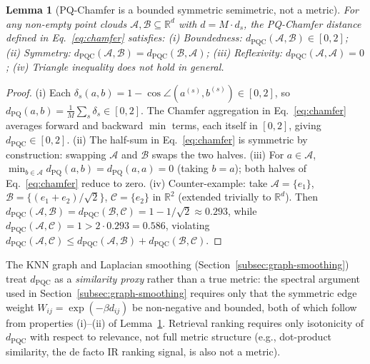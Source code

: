 \documentclass[review,1p]{elsarticle}
\newtheorem{lemma}{Lemma}
\begin{document}
\begin{lemma}[PQ-Chamfer is a bounded symmetric semimetric, not a metric]
\label{lem:pq-chamfer-semimetric}
For any non-empty point clouds $\mathcal{A}, \mathcal{B} \subseteq \mathbb{R}^{d}$ with $d = M \cdot d_s$, the PQ-Chamfer distance defined in Eq.~\eqref{eq:chamfer} satisfies:
\textup{(i) Boundedness:} $d_{\mathrm{PQC}}(\mathcal{A}, \mathcal{B}) \in [0, 2]$;
\textup{(ii) Symmetry:} $d_{\mathrm{PQC}}(\mathcal{A}, \mathcal{B}) = d_{\mathrm{PQC}}(\mathcal{B}, \mathcal{A})$;
\textup{(iii) Reflexivity:} $d_{\mathrm{PQC}}(\mathcal{A}, \mathcal{A}) = 0$;
\textup{(iv) Triangle inequality does \emph{not} hold in general.}
\end{lemma}
\begin{proof}
(i) Each $\delta_s(a,b) = 1 - \cos\angle(a^{(s)}, b^{(s)}) \in [0, 2]$, so $d_{\mathrm{PQ}}(a,b) = \tfrac{1}{M}\sum_s \delta_s \in [0, 2]$. The Chamfer aggregation in Eq.~\eqref{eq:chamfer} averages forward and backward $\min$ terms, each itself in $[0, 2]$, giving $d_{\mathrm{PQC}} \in [0, 2]$.
(ii) The half-sum in Eq.~\eqref{eq:chamfer} is symmetric by construction: swapping $\mathcal{A}$ and $\mathcal{B}$ swaps the two halves.
(iii) For $a \in \mathcal{A}$, $\min_{b \in \mathcal{A}} d_{\mathrm{PQ}}(a, b) = d_{\mathrm{PQ}}(a, a) = 0$ (taking $b = a$); both halves of Eq.~\eqref{eq:chamfer} reduce to zero.
(iv) Counter-example: take $\mathcal{A} = \{e_1\}$, $\mathcal{B} = \{(e_1 + e_2)/\sqrt{2}\}$, $\mathcal{C} = \{e_2\}$ in $\mathbb{R}^2$ (extended trivially to $\mathbb{R}^{d}$). Then $d_{\mathrm{PQC}}(\mathcal{A},\mathcal{B}) = d_{\mathrm{PQC}}(\mathcal{B},\mathcal{C}) = 1 - 1/\sqrt{2} \approx 0.293$, while $d_{\mathrm{PQC}}(\mathcal{A},\mathcal{C}) = 1 > 2 \cdot 0.293 = 0.586$, violating $d_{\mathrm{PQC}}(\mathcal{A},\mathcal{C}) \le d_{\mathrm{PQC}}(\mathcal{A},\mathcal{B}) + d_{\mathrm{PQC}}(\mathcal{B},\mathcal{C})$.
\end{proof}

\noindent The KNN graph and Laplacian smoothing (Section~\ref{subsec:graph-smoothing}) treat $d_{\mathrm{PQC}}$ as a \emph{similarity proxy} rather than a true metric: the spectral argument used in Section~\ref{subsec:graph-smoothing} requires only that the symmetric edge weight $W_{ij} = \exp(-\beta d_{ij})$ be non-negative and bounded, both of which follow from properties (i)--(ii) of Lemma~\ref{lem:pq-chamfer-semimetric}. Retrieval ranking requires only isotonicity of $d_{\mathrm{PQC}}$ with respect to relevance, not full metric structure (e.g., dot-product similarity, the de facto IR ranking signal, is also not a metric).
\end{document}
